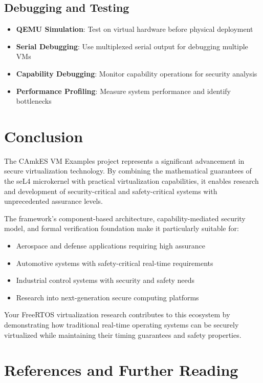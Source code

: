 \documentclass[12pt,a4paper]{article}
\begin{document}
\subsection{Debugging and Testing}

\begin{itemize}
    \item \textbf{QEMU Simulation}: Test on virtual hardware before physical deployment
    \item \textbf{Serial Debugging}: Use multiplexed serial output for debugging multiple VMs
    \item \textbf{Capability Debugging}: Monitor capability operations for security analysis
    \item \textbf{Performance Profiling}: Measure system performance and identify bottlenecks
\end{itemize}

\section{Conclusion}

The CAmkES VM Examples project represents a significant advancement in secure virtualization technology. By combining the mathematical guarantees of the seL4 microkernel with practical virtualization capabilities, it enables research and development of security-critical and safety-critical systems with unprecedented assurance levels.

The framework's component-based architecture, capability-mediated security model, and formal verification foundation make it particularly suitable for:

\begin{itemize}
    \item Aerospace and defense applications requiring high assurance
    \item Automotive systems with safety-critical real-time requirements
    \item Industrial control systems with security and safety needs
    \item Research into next-generation secure computing platforms
\end{itemize}

Your FreeRTOS virtualization research contributes to this ecosystem by demonstrating how traditional real-time operating systems can be securely virtualized while maintaining their timing guarantees and safety properties.

\section{References and Further Reading}
\end{document}
